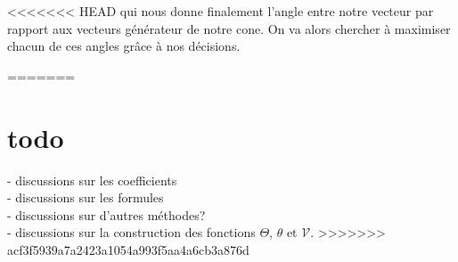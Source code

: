 \documentclass[11pt, oneside]{article}
\begin{document}
<<<<<<< HEAD
qui nous donne finalement l'angle entre notre vecteur par rapport aux vecteurs générateur de notre cone. On va alors chercher à maximiser chacun de ces angles grâce à nos décisions. 

=======

\section{todo}

- discussions sur les coefficients \\
- discussions sur les formules \\
- discussions sur d'autres méthodes? \\
- discussions sur la construction des fonctions $\Theta$, $\theta$ et $\mathcal{V}$.
>>>>>>> acf3f5939a7a2423a1054a993f5aa4a6cb3a876d
\end{document}
